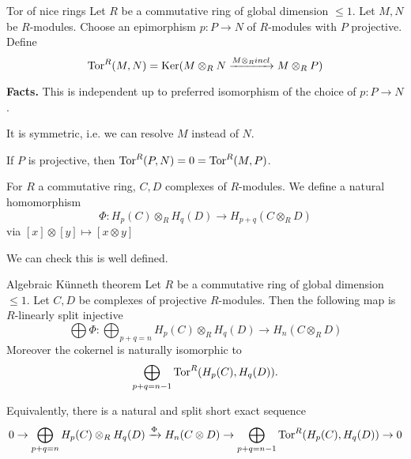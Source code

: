 \documentclass[language=english]{TemplateLecture}
\begin{document}
\begin{defi}{Tor of nice rings}{}
    Let \(R\) be a commutative ring of global dimension \(\leq 1\). Let \(M,N\) be \(R\)-modules. Choose an epimorphism \(p\colon P \to N\) of \(R\)-modules with \(P\) projective. Define
    \[\mathrm{Tor}^R(M,N) = \operatorname{Ker}(M\otimes_R N \xrightarrow{M\otimes_R incl} M\otimes_R P)\]
\end{defi}

\textbf{Facts.} This is independent up to preferred isomorphism of the choice of \(p\colon P \to N\).

It is symmetric, i.e. we can resolve \(M\) instead of \(N\).

If \(P\) is projective, then \(\mathrm{Tor}^R(P,N) = 0 = \mathrm{Tor}^R(M,P)\).

\begin{construction}
    For \(R\) a commutative ring, \(C,D\) complexes of \(R\)-modules. We define a natural homomorphism
    \[\Phi \colon H_p(C) \otimes_R H_q(D) \to H_{p+q}(C\otimes_R D)\]
    via \([x] \otimes [y] \mapsto [x\otimes y]\)
\end{construction}

We can check this is well defined.

\begin{thm}{Algebraic Künneth theorem}{}
    Let \(R\) be a commutative ring of global dimension \(\leq 1\). Let \(C, D\) be complexes of projective \(R\)-modules. Then the following map is \(R\)-linearly split injective
    \[\bigoplus \Phi \colon \bigoplus_{p+q = n} H_p(C) \otimes_R H_q(D) \to H_n(C \otimes_R D)\]
    Moreover the cokernel is naturally isomorphic to
    \[\bigoplus_{p+q = n-1} \mathrm{Tor}^R(H_p(C), H_q(D)).\]

    Equivalently, there is a natural and split short exact sequence
    \[0 \to \bigoplus_{p+q = n} H_p(C) \otimes_R H_q(D) \xrightarrow{\Phi} H_n(C\otimes D) \to \bigoplus_{p+q = n-1} \mathrm{Tor}^R(H_p(C), H_q(D)) \to 0\]
\end{thm}
\end{document}
